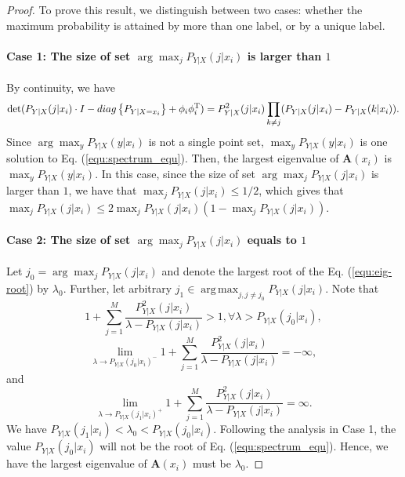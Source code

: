 \documentclass[10pt,a4paper]{amsart}
\DeclareMathOperator*{\argmax}{arg\,max}
\begin{document}
\begin{proof}
To prove this result, we distinguish between two cases: whether the maximum probability is attained by more than one label, or by a unique label.

\paragraph{Case 1: The size of set $\arg\max_j P_{Y|X}(j|x_i)$ is larger than $1$}
By continuity, we have 
\begin{equation*}
\det(P_{Y|X}(j|x_i)\cdot I- {\rm diag}\left\{ P_{Y|X=x_i} \right\} + \phi_i\phi_i^\mathrm{T})= P_{Y|X}^2(j|x_i)\prod_{k\ne j}(P_{Y|X}(j|x_i)-P_{Y|X}(k|x_i)).
\end{equation*}
Since $\arg\max_y P_{Y|X}(y|x_i)$ is not a single point set, $\max_y P_{Y|X}(y|x_i)$ is one solution to Eq. (\ref{equ:spectrum_equ}). Then, the largest eigenvalue of $\mathbf{A}(x_i)$ is $\max_y P_{Y|X}(y|x_i)$. In this case, since the size of set  $\arg\max_j P_{Y|X}(j|x_i)$ is larger than $1$, we have that $\max_j P_{Y|X}(j|x_i) \leq 1/2$, which gives that $\max_j P_{Y|X}(j|x_i) \leq 2\max_j P_{Y|X}(j|x_i)(1-\max_j P_{Y|X}(j|x_i))$.

\paragraph{Case 2: The size of set  $\arg\max_j P_{Y|X}(j|x_i)$ equals to $1$}
Let $j_0=\arg\max_j P_{Y|X}(j|x_i)$ and denote the largest root of the Eq. (\ref{equ:eig-root}) by $\lambda_0$.
Further, let arbitrary $j_1\in\argmax_{j,j\ne j_0} P_{Y|X}(j|x_i)$. Note that
\begin{equation*}
    1+\sum_{j=1}^M\frac{P_{Y|X}^2(j|x_i)}{\lambda-P_{Y|X}(j|x_i)}>1,\forall\lambda>P_{Y|X}(j_0|x_i),
\end{equation*}
\begin{equation*}
    \lim_{\lambda\to P_{Y|X}(j_0|x_i)^-}1+\sum_{j=1}^M\frac{P_{Y|X}^2(j|x_i)}{\lambda-P_{Y|X}(j|x_i)}=-\infty,
\end{equation*}
and
\begin{equation*}
    \lim_{\lambda\to P_{Y|X}(j_1|x_i)^+}1+\sum_{j=1}^M\frac{P_{Y|X}^2(j|x_i)}{\lambda-P_{Y|X}(j|x_i)}=\infty.
\end{equation*}
We have $P_{Y|X}(j_1|x_i) < \lambda_0 <P_{Y|X}(j_0|x_i)$. Following the analysis in Case 1, the value $P_{Y|X}(j_0|x_i)$ will not be the root of Eq. (\ref{equ:spectrum_equ}). Hence, we have the largest eigenvalue of $\mathbf{A}(x_i)$ must be $\lambda_0$.


\end{proof}
\end{document}
